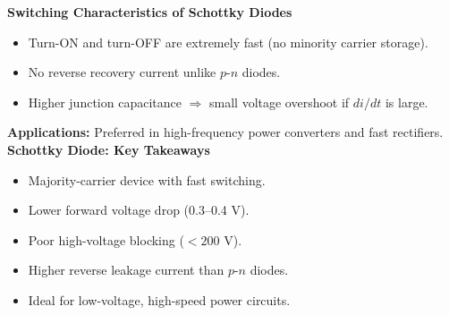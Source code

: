 \begin{frame}{\textbf{Switching Characteristics of Schottky Diodes}}
    \begin{itemize}
        \item Turn-ON and turn-OFF are extremely fast (no minority carrier storage).
        \item No reverse recovery current unlike $p$-$n$ diodes.
        \item Higher junction capacitance $\Rightarrow$ small voltage overshoot if $di/dt$ is large.
    \end{itemize}
    
    \textbf{Applications:} Preferred in high-frequency power converters and fast rectifiers. \\
    \textbf{Schottky Diode: Key Takeaways}
    \begin{itemize}
        \item Majority-carrier device with fast switching.
        \item Lower forward voltage drop (0.3–0.4 V).
        \item Poor high-voltage blocking ($<200$ V).
        \item Higher reverse leakage current than $p$-$n$ diodes.
        \item Ideal for low-voltage, high-speed power circuits.
    \end{itemize}
\end{frame}
    